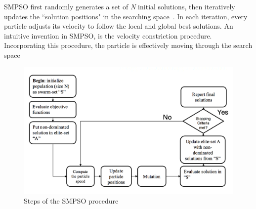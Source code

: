 \documentclass[10pt,journal,compsoc]{IEEEtran}
\begin{document}
SMPSO first randomly generates a set of \textit{N} initial solutions, then iteratively updates the ``solution positions" in the searching space~\cite{smpso}.
In each iteration, every particle adjusts its velocity to follow the local and global best solutions. An intuitive invention in SMPSO, is the velocity constriction procedure. Incorporating this procedure, the particle is effectively moving through the search space \cite{smpso} 

\begin{figure}[ht]
\centerline{\includegraphics[width=\columnwidth]{psophaseflowchart.png}}
\caption{Steps of the SMPSO procedure} 
\label{smpsoflow}
\end{figure}
\end{document}
